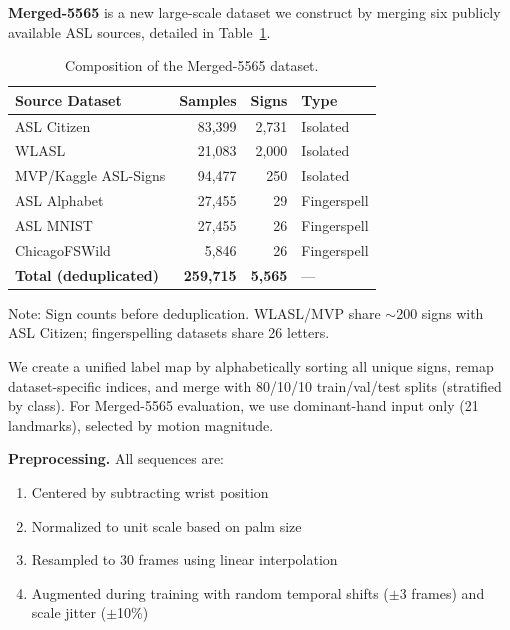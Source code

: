 \documentclass{article}
\theoremstyle{definition}
\theoremstyle{remark}
\begin{document}
\textbf{Merged-5565} is a new large-scale dataset we construct by merging six publicly available ASL sources, detailed in Table~\ref{tab:merged_sources}.

\begin{table}[h]
\caption{Composition of the Merged-5565 dataset.}
\label{tab:merged_sources}
\vskip 0.05in
\begin{center}
\begin{small}
\begin{tabular}{lrrl}
\toprule
Source Dataset & Samples & Signs & Type \\
\midrule
ASL Citizen \citep{desai2023asl} & 83,399 & 2,731 & Isolated \\
WLASL \citep{li2020word} & 21,083 & 2,000 & Isolated \\
MVP/Kaggle ASL-Signs & 94,477 & 250 & Isolated \\
\addlinespace
ASL Alphabet & 27,455 & 29 & Fingerspell \\
ASL MNIST & 27,455 & 26 & Fingerspell \\
ChicagoFSWild & 5,846 & 26 & Fingerspell \\
\midrule
\textbf{Total (deduplicated)} & \textbf{259,715} & \textbf{5,565} & --- \\
\bottomrule
\end{tabular}
\end{small}
\end{center}
\vskip -0.15in
{\footnotesize Note: Sign counts before deduplication. WLASL/MVP share ${\sim}$200 signs with ASL Citizen; fingerspelling datasets share 26 letters.}
\vskip -0.1in
\end{table}

We create a unified label map by alphabetically sorting all unique signs, remap dataset-specific indices, and merge with 80/10/10 train/val/test splits (stratified by class). For Merged-5565 evaluation, we use dominant-hand input only (21 landmarks), selected by motion magnitude.

\textbf{Preprocessing.} All sequences are:
\begin{enumerate}[nosep,topsep=3pt,leftmargin=*]
\item Centered by subtracting wrist position
\item Normalized to unit scale based on palm size
\item Resampled to 30 frames using linear interpolation
\item Augmented during training with random temporal shifts ($\pm$3 frames) and scale jitter ($\pm$10\%)
\end{enumerate}
\end{document}
